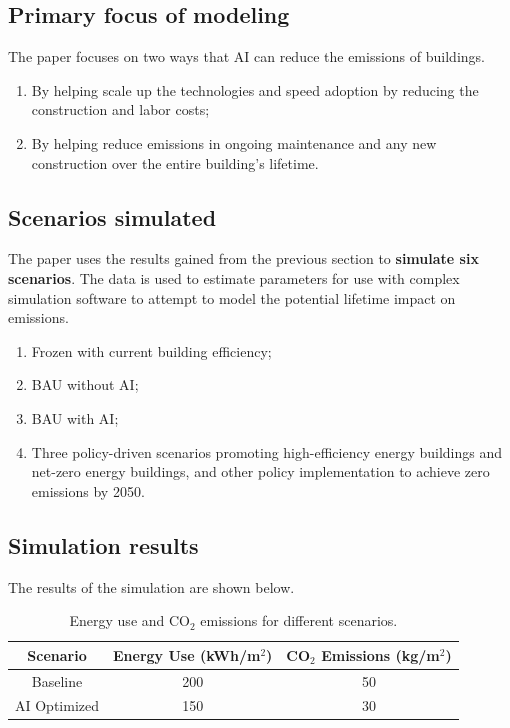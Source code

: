 \documentclass[conference,a4paper]{IEEEtran}
\begin{document}
\subsection*{Primary focus of modeling}

The paper focuses on two ways that AI can reduce the emissions of buildings.

\begin{enumerate}
    \item By helping scale up the technologies and speed adoption by reducing the construction and labor costs;
    \item By helping reduce emissions in ongoing maintenance and any new construction over the entire building's lifetime.
\end{enumerate}

\subsection*{Scenarios simulated}
The paper uses the results gained from the previous section to \textbf{simulate six scenarios}. The data is used to estimate parameters for use with complex simulation software to attempt to model the potential lifetime impact on emissions.
\begin{enumerate}
    \item Frozen with current building efficiency;
    \item BAU without AI;
    \item BAU with AI;
    \item Three policy-driven scenarios promoting high-efficiency energy buildings and net-zero energy buildings, and other policy implementation to achieve zero emissions by 2050.
\end{enumerate}


\subsection*{Simulation results}
The results of the simulation are shown below.

\begin{table}
\centering
\begin{tabular}{|c|c|c|}
\hline
\textbf{Scenario} & \textbf{Energy Use (kWh/m$^2$)} & \textbf{CO$_2$ Emissions (kg/m$^2$)} \\
\hline 
Baseline & 200 & 50 \\
\hline
AI Optimized & 150 & 30 \\
\hline
\end{tabular}
\caption{Energy use and CO$_2$ emissions for different scenarios.}
\label{tab:energy-emissions}
\end{table}
\end{document}
